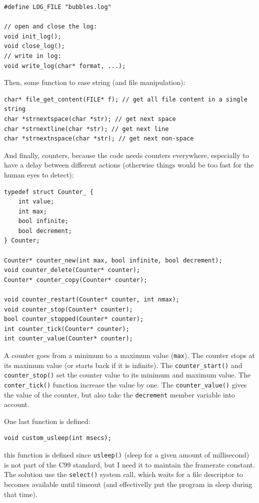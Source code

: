 \documentclass[12pt,a4paper]{article}
\newcommand{\cc}[1]{\texttt{#1}}
\begin{document}
\begin{verbatim}
#define LOG_FILE "bubbles.log"

// open and close the log:
void init_log();
void close_log();
// write in log:
void write_log(char* format, ...);
\end{verbatim}

Then, some function to ease string (and file manipulation):

\begin{verbatim}
char* file_get_content(FILE* f); // get all file content in a single string
char *strnextspace(char *str); // get next space
char *strnextline(char *str); // get next line
char *strnextnspace(char *str); // get next non-space
\end{verbatim}

And finally, counters, because the code needs counters everywhere, especially to have a delay between different actions (otherwise things would be too fast for the human eyes to detect): 

\begin{verbatim}
typedef struct Counter_ {
    int value;
    int max;
    bool infinite;
    bool decrement;
} Counter;

Counter* counter_new(int max, bool infinite, bool decrement);
void counter_delete(Counter* counter);
Counter* counter_copy(Counter* counter);

void counter_restart(Counter* counter, int nmax);
void counter_stop(Counter* counter);
bool counter_stopped(Counter* counter);
int counter_tick(Counter* counter);
int counter_value(Counter* counter);
\end{verbatim}

A counter goes from a minimum to a maximum value (\cc{max}). The counter stops at its maximum value (or starts back if it is infinite). The \cc{counter_start()} and \cc{counter_stop()} set the counter value to its minimum and maximum value. The \cc{conter_tick()} function increase the value by one. The \cc{counter_value()} gives the value of the counter, but also take the \cc{decrement} member variable into account.

One last function is defined:\begin{verbatim}
void custom_usleep(int msecs);
\end{verbatim}
this function is defined since \cc{usleep()} (sleep for a given amount of millisecond) is not part of the C99 standard, but I need it to maintain the framerate constant. The solution use the \cc{select()} system call, which waits for a file descriptor to becomes available until timeout (and effectivelly put the program in sleep during that time).
\end{document}
